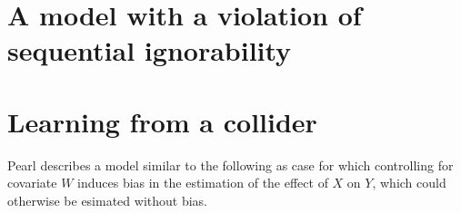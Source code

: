 \documentclass[12pt,]{book}
\newenvironment{Shaded}{\begin{snugshade}}{\end{snugshade}}
\newcommand{\DataTypeTok}[1]{\textcolor[rgb]{0.13,0.29,0.53}{#1}}
\newcommand{\DecValTok}[1]{\textcolor[rgb]{0.00,0.00,0.81}{#1}}
\newcommand{\FloatTok}[1]{\textcolor[rgb]{0.00,0.00,0.81}{#1}}
\newcommand{\KeywordTok}[1]{\textcolor[rgb]{0.13,0.29,0.53}{\textbf{#1}}}
\newcommand{\NormalTok}[1]{#1}
\newcommand{\OperatorTok}[1]{\textcolor[rgb]{0.81,0.36,0.00}{\textbf{#1}}}
\newcommand{\StringTok}[1]{\textcolor[rgb]{0.31,0.60,0.02}{#1}}
\begin{document}
\hypertarget{a-model-with-a-violation-of-sequential-ignorability}{%
\section{A model with a violation of sequential ignorability}\label{a-model-with-a-violation-of-sequential-ignorability}}

\hypertarget{learning-from-a-collider}{%
\section{Learning from a collider}\label{learning-from-a-collider}}

Pearl describes a model similar to the following as case for which controlling for covariate \(W\) induces bias in the estimation of the effect of \(X\) on \(Y\), which could otherwise be esimated without bias.

\begin{Shaded}
\end{Shaded}
\end{document}
